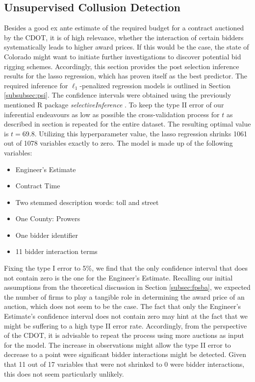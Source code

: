 \documentclass[a4paper,12pt, headsepline]{scrartcl}
\numberwithin{equation}{section}
\begin{document}
\subsection{Unsupervised Collusion Detection}\label{subsec:col}
Besides a good ex ante estimate of the required budget for a contract auctioned by the CDOT, it is of high relevance, whether the interaction of certain bidders systematically leads to higher award prices. If this would be the case, the state of Colorado might want to initiate further investigations to discover potential bid rigging schemes. Accordingly, this section provides the post selection inference results for the lasso regression, which has proven itself as the best predictor. The required inference for $\ell_1$-penalized regression models is outlined in Section \ref{subsubsec:psi}. The confidence intervals were obtained using the previously mentioned R package \textit{selectiveInference} \citep{selectiveInference}. To keep the type II error of our inferential endeavours as low as possible the cross-validation process for $t$ as described in section is repeated for the entire dataset. The resulting optimal value is $t = 69.8$. Utilizing this hyperparameter value, the lasso regression shrinks 1061 out of 1078 variables exactly to zero. The model is made up of the following variables:
\begin{itemize}
	\item Engineer's Estimate
	\item Contract Time
	\item Two stemmed description words: toll and street
	\item One County: Prowers
	\item One bidder identifier
	\item 11 bidder interaction terms 
\end{itemize}
Fixing the type I error to 5\%, we find that the only confidence interval that does not contain zero is the one for the Engineer's Estimate. Recalling our initial assumptions from the theoretical discussion in Section \ref{subsec:fpsba}, we expected the number of firms to play a tangible role in determining the award price of an auction, which does not seem to be the case. The fact that only the Engineer's Estimate's confidence interval does not contain zero may hint at the fact that we might be suffering to a high type II error rate. Accordingly, from the perspective of the CDOT, it is advisable to repeat the process using more auctions as input for the model. The increase in observations might allow the type II error to decrease to a point were significant bidder interactions might be detected. Given that 11 out of 17 variables that were not shrinked to 0 were bidder interactions, this does not seem particularly unlikely.
\end{document}
